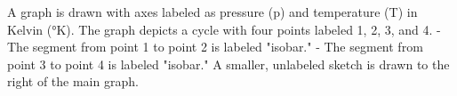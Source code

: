 A graph is drawn with axes labeled as pressure (p) and temperature (T) in Kelvin (°K). The graph depicts a cycle with four points labeled 1, 2, 3, and 4.  
- The segment from point 1 to point 2 is labeled "isobar."  
- The segment from point 3 to point 4 is labeled "isobar."  
A smaller, unlabeled sketch is drawn to the right of the main graph.